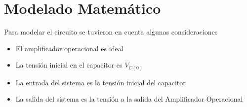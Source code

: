 \documentclass[10pt,a4paper]{article} %
\begin{document}
\section{Modelado Matemático}
Para modelar el circuito se tuvieron en cuenta algunas consideraciones

\begin{itemize}
    \item El amplificador operacional es ideal
    \item La tensión inicial en el capacitor es $V_{C(0)}$
    \item La entrada del sistema es la tensión inicial del capacitor
    \item La salida del sistema es la tensión a la salida del Amplificador Operacional
\end{itemize}
\end{document}
